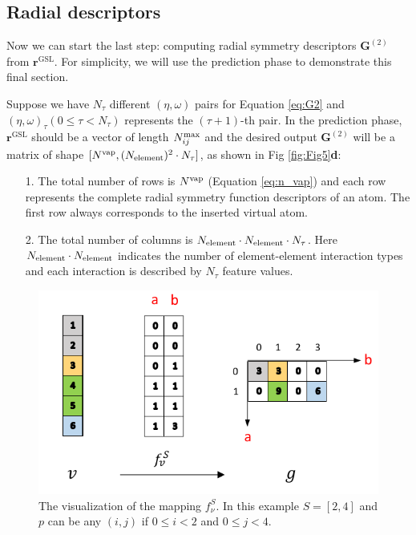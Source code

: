 \documentclass[preprint]{revtex4-2}
\begin{document}
\subsection{Radial descriptors}
\label{section:radial_descriptors}

% 
%

Now we can start the last step: computing radial symmetry descriptors 
$\mathbf{G}^{(2)}$ from $\mathbf{r}^{\mathrm{GSL}}$. For simplicity, we will use 
the prediction phase to demonstrate this final section. 

Suppose we have $N_{\tau}$ different $(\eta, \omega)$ pairs for Equation 
\ref{eq:G2} and $(\eta, \omega)_{\tau} (0 \le \tau < N_{\tau})$ represents the 
$(\tau+1)$-th pair. In the prediction phase, $\mathbf{r}^{\mathrm{GSL}}$ should 
be a vector of length $N_{ij}^{\mathrm{max}}$ and the desired output $\mathbf{G}^{(2)}$ will 
be a matrix of shape $[N^{\mathrm{vap}}, (N_{\mathrm{element}})^2 \cdot N_{\tau}]$, as shown in 
Fig \ref{fig:Fig5}\textbf{d}:
\begin{itemize}
    \item[1.] 
    The total number of rows is $N^{\mathrm{vap}}$ (Equation \ref{eq:n_vap}) and each row
    represents the complete radial symmetry function descriptors of an atom. The 
    first row always corresponds to the inserted virtual atom.
    \item[2.]
    The total number of columns is $N_{\mathrm{element}} \cdot N_{\mathrm{element}} \cdot N_{\tau}$. Here 
    $N_{\mathrm{element}} \cdot N_{\mathrm{element}}$ indicates the number of element-element interaction types 
    and each interaction is described by $N_{\tau}$ feature values.
\end{itemize}

\begin{figure}[h!]
\centering
\includegraphics[scale=1.0]{figures/Fig4.pdf}
\caption{\label{fig:Fig4} The visualization of the mapping $f^S_{\nu}$.
In this example $S = [2,4]$ and $p$ can be any $(i,j)$ if 
$0 \le i < 2$ and $0 \le j < 4$.
}
\end{figure}
\end{document}
